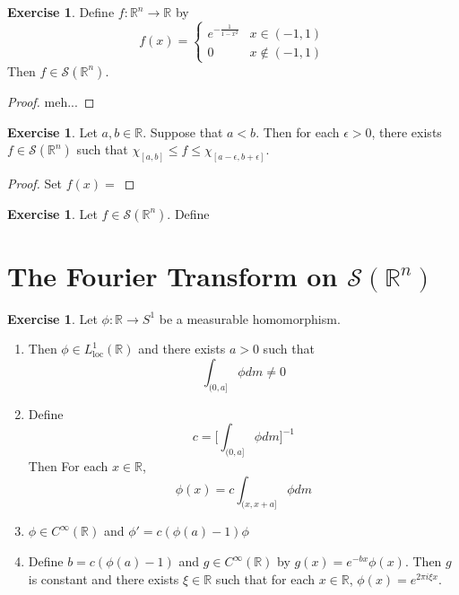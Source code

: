 \documentclass{book}
\theoremstyle{definition}
\newtheorem{ex}[definition]{Exercise}
\newcommand{\ep}{\epsilon}
\newcommand{\R}{\mathbb{R}}
\newcommand{\MS}{\mathcal{S}}
\newcommand{\lex}[1]{\label{ex:#1}}
\DeclareMathOperator*{\0}{\mbf{0}}
\DeclareMathOperator*{\1}{\mbf{1}}
\newcommand{\loc}{\text{loc}}
\begin{document}
	\begin{ex}
		Define $f:\R^n \rightarrow \R$ by 
		\[
		f(x) = 
		\begin{cases}
			e^{- \frac{1}{1-x^2}} & x \in (-1, 1) \\
			0 & x \not \in (-1, 1)
		\end{cases}
		\]
		Then $f \in \MS(\R^n)$.
	\end{ex}
	
	\begin{proof}
		meh...
	\end{proof}

	\begin{ex}
		Let $a,b \in \R$. Suppose that $a < b$. Then for each $\ep >0$, there exists $f \in \MS(\R^n)$ such that $\chi_{[a,b]} \leq f \leq \chi_{[a-\ep , b + \ep]}$.
	\end{ex}

	\begin{proof}
		Set $f(x) = $
	\end{proof}

	\begin{ex}
		Let $f \in \MS(\R^n)$. Define
	\end{ex}
	
	
	
	
	
	
	
	
	
	
	
	
	
	
	
	
	
	
	
	
	
	
	
	
	
	
	
	
	
	
	
	
	
	
	\newpage
	\section{The Fourier Transform on $\MS(\R^n)$}
	
	\begin{ex}
		\lex{300} Let $\phi:\R \rightarrow S^1$ be a measurable homomorphism. 
		\begin{enumerate}
			\item Then $\phi \in L^1_{\loc}(\R)$ and there exists $a > 0$ such that $$\int_{(0,a]}\phi dm \neq 0$$
			\item Define $$c = \bigg[ \int_{(0,a]}\phi dm \bigg]^{-1}$$ 
			Then  For each $x \in \R$, $$\phi(x) = c\int_{(x, x+a]}\phi dm$$ 
			\item $\phi \in C^{\infty}(\R)$ and $\phi' = c(\phi(a) - 1)\phi$
			\item Define $b = c(\phi(a) - 1)$ and $g \in C^{\infty}(\R)$ by $g(x) = e^{-bx} \phi(x)$. Then $g$ is constant and there exists $\xi \in \R$ such that for each $x \in \R$, $\phi(x) = e^{2 \pi i \xi x}$.
		\end{enumerate}
	\end{ex}	
	
\end{document}
